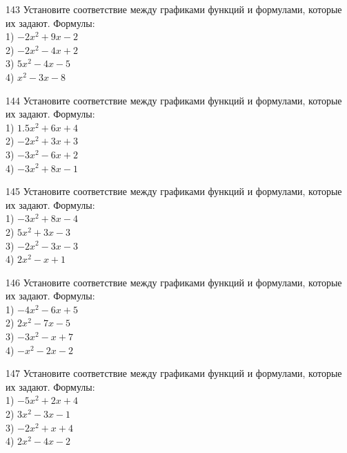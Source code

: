 \documentclass[4apaper]{article}
\begin{document}
\begin{taskBN}{143}
Установите соответствие между графиками функций и формулами, которые их задают. Формулы: \\1) $-2x^2+9x-2$\\2) $-2x^2-4x+2$\\3) $5x^2-4x-5$\\4) $x^2-3x-8$
\end{taskBN}

\begin{taskBN}{144}
Установите соответствие между графиками функций и формулами, которые их задают. Формулы: \\1) $1.5x^2+6x+4$\\2) $-2x^2+3x+3$\\3) $-3x^2-6x+2$\\4) $-3x^2+8x-1$
\end{taskBN}

\begin{taskBN}{145}
Установите соответствие между графиками функций и формулами, которые их задают. Формулы: \\1) $-3x^2+8x-4$\\2) $5x^2+3x-3$\\3) $-2x^2-3x-3$\\4) $2x^2-x+1$
\end{taskBN}

\begin{taskBN}{146}
Установите соответствие между графиками функций и формулами, которые их задают. Формулы: \\1) $-4x^2-6x+5$\\2) $2x^2-7x-5$\\3) $-3x^2-x+7$\\4) $-x^2-2x-2$
\end{taskBN}

\begin{taskBN}{147}
Установите соответствие между графиками функций и формулами, которые их задают. Формулы: \\1) $-5x^2+2x+4$\\2) $3x^2-3x-1$\\3) $-2x^2+x+4$\\4) $2x^2-4x-2$
\end{taskBN}
\end{document}
